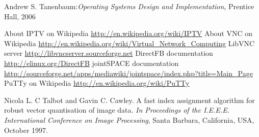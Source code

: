 \renewcommand{\bibname}{References}
\bibintoc %
\begin{thebibliography}{20}
 Andrew S. Tanenbaum:\emph{Operating Systems Design and Implementation}, Prentice Hall, 2006

 About IPTV on Wikipedia \url{http://en.wikipedia.org/wiki/IPTV}
 About VNC on Wikipedia \url{http://en.wikipedia.org/wiki/Virtual_Network_Computing}
LibVNC server \url{http://libvncserver.sourceforge.net}
DirectFB documentation \url{http://elinux.org/DirectFB}
jointSPACE documentation \url{http://sourceforge.net/apps/mediawiki/jointspace/index.php?title=Main_Page}
PuTTy on Wikipedia \url{http://en.wikipedia.org/wiki/PuTTy}

 Nicola L. C Talbot and Gavin C. Cawley. A fast index assignment algorithm for robust vector quantisation of image data. \emph{In Proceedings of the I.E.E.E. International Conference on Image Processing}, Santa Barbara, California, USA,  October 1997.

\end{thebibliography}

